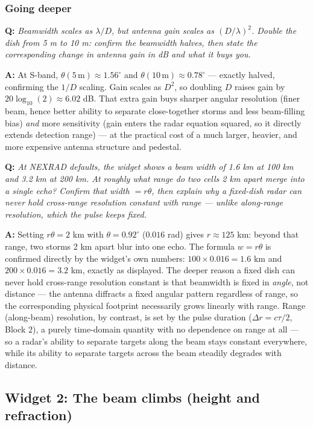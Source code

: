 \documentclass[11pt]{article}
\newenvironment{qa}[1]{\par\noindent\textbf{\color{qgray}Q: }\emph{#1}\par\noindent\textbf{A: }}{\par\vspace{6pt}}
\newcommand{\tier}[1]{\subsubsection*{#1}}
\begin{document}
\tier{Going deeper}
\begin{qa}{Beamwidth scales as $\lambda/D$, but antenna gain scales as $(D/\lambda)^2$. Double the dish from 5 m to 10 m: confirm the beamwidth halves, then state the corresponding change in antenna gain in dB and what it buys you.}
At S-band, $\theta(5\,\mathrm{m})\approx1.56^\circ$ and $\theta(10\,\mathrm{m})\approx0.78^\circ$ --- exactly halved, confirming the $1/D$ scaling. Gain scales as $D^2$, so doubling $D$ raises gain by $20\log_{10}(2)\approx6.02$ dB. That extra gain buys sharper angular resolution (finer beam, hence better ability to separate close-together storms and less beam-filling bias) \emph{and} more sensitivity (gain enters the radar equation squared, so it directly extends detection range) --- at the practical cost of a much larger, heavier, and more expensive antenna structure and pedestal.
\end{qa}
\begin{qa}{At NEXRAD defaults, the widget shows a beam width of 1.6 km at 100 km and 3.2 km at 200 km. At roughly what range do two cells 2 km apart merge into a single echo? Confirm that width $=r\theta$, then explain why a fixed-dish radar can never hold cross-range resolution constant with range --- unlike along-range resolution, which the pulse keeps fixed.}
Setting $r\theta = 2$ km with $\theta=0.92^\circ$ ($0.016$ rad) gives $r\approx125$ km: beyond that range, two storms 2 km apart blur into one echo. The formula $w=r\theta$ is confirmed directly by the widget's own numbers: $100\times0.016=1.6$ km and $200\times0.016=3.2$ km, exactly as displayed. The deeper reason a fixed dish can never hold cross-range resolution constant is that beamwidth is fixed in \emph{angle}, not distance --- the antenna diffracts a fixed angular pattern regardless of range, so the corresponding physical footprint necessarily grows linearly with range. Range (along-beam) resolution, by contrast, is set by the pulse duration ($\Delta r = c\tau/2$, Block 2), a purely time-domain quantity with no dependence on range at all --- so a radar's ability to separate targets along the beam stays constant everywhere, while its ability to separate targets across the beam steadily degrades with distance.
\end{qa}

\subsection{Widget 2: The beam climbs (height and refraction)}
\end{document}
